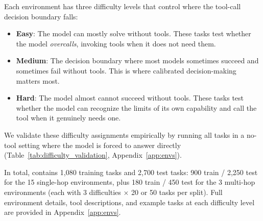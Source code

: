 Each environment has three difficulty levels that control where the tool-call decision boundary falls:
\vspace{-5pt}
\begin{itemize}[leftmargin=*]
    \item \textbf{Easy}: The model can mostly solve without tools. These tasks test whether the model \emph{overcalls}, invoking tools when it does not need them.
    \item \textbf{Medium}: The decision boundary where most models sometimes succeed and sometimes fail without tools. This is where calibrated decision-making matters most.
    \item \textbf{Hard}: The model almost cannot succeed without tools. These tasks test whether the model can recognize the limits of its own capability and call the tool when it genuinely needs one.
\end{itemize}
\vspace{-5pt}
We validate these difficulty assignments empirically by running all tasks in a no-tool setting where the model is forced to answer directly (Table~\ref{tab:difficulty_validation}, Appendix~\ref{app:envs}). 


In total, \benchmark{} contains 1{,}080 training tasks and 2{,}700 test tasks: 900 train / 2{,}250 test for the 15 single-hop environments, plus 180 train / 450 test for the 3 multi-hop environments (each with 3 difficulties $\times$ 20 or 50 tasks per split). Full environment details, tool descriptions, and example tasks at each difficulty level are provided in Appendix~\ref{app:envs}.

